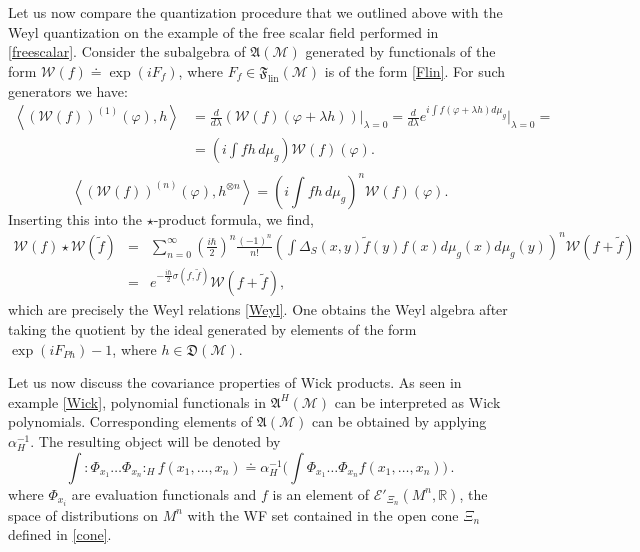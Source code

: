 \documentclass[12pt]{article}
\newcommand{\fA}{\mathfrak{A}}
\newcommand{\D}{\mathfrak{D}}
\newcommand{\F}{\mathfrak{F}}
\newcommand{\Ecal}{\mathcal{E}}
\newcommand{\Mcal}{\mathcal{M}}
\newcommand{\Wcal}{\mathcal{W}}
\newcommand{\RR}{\mathbb{R}}           %
\newcommand{\al}{\alpha}
\newcommand{\ph}{\varphi}
\newcommand{\sst}[1]{\scriptscriptstyle{#1}}  %
\newcommand{\1}{\mathds{1}}                         %
\newcommand{\be}{\begin{equation}}
\newcommand{\ee}{\end{equation}}
\begin{document}
{{Let us now compare the quantization procedure that we outlined above with the Weyl quantization on the example of the free scalar field performed in \ref{freescalar}. Consider the subalgebra of $\fA(\Mcal)$ generated by functionals of the form $\Wcal(f)\doteq\exp(iF_f)$, where $F_f\in \F_{\textrm{lin}}(\Mcal)$ is of the form \eqref{Flin}. For such generators we have:
\begin{align*}
\left< (\Wcal(f))^{(1)}(\ph),h\right>&= \frac{d}{d\lambda}\left( \Wcal(f) (\ph + \lambda h)\right)|_{\lambda=0}= \frac{d}{d \lambda}  e^{i \int  f (\ph + \lambda h)d\mu_g} \big|_{\lambda=0}=\\
&=\left( i \int f h\,d\mu_g\right) \Wcal(f)(\ph).\\
\end{align*}
\[
\left<(\Wcal(f))^{(n)}(\ph),h^{\otimes n}\right>=  \left( i \int f h\,d\mu_g\right)^n \Wcal(f)(\ph).
\]
Inserting this into the $\star$-product formula, we find,
\begin{eqnarray*}
\Wcal(f) \star \Wcal(\tilde{f}) &=&  \sum_{n=0}^{\infty} \left( \frac{i \hbar}{2}\right)^n \frac{(-1)^n}{n!} \left( \int \Delta_S(x,y) \tilde{f}(y)f(x)d\mu_g(x)d\mu_g(y)\right)^n\Wcal(f+\tilde{f})\\
&=& e^{-\frac{i \hbar}{2}\sigma(f,\tilde{f})} \Wcal(f+\tilde{f}),
\end{eqnarray*}
which are precisely the Weyl relations \eqref{Weyl}. One obtains the Weyl algebra after taking the quotient by the ideal generated by elements of the form $\exp(iF_{Ph})-1$, where $h\in\D(\Mcal)$.

 Let us now discuss the covariance properties of Wick products. As seen in example \ref{Wick}, polynomial functionals in $\fA^{\sst H}(\Mcal)$ can be interpreted as Wick polynomials.
Corresponding elements of $\fA(\Mcal)$ can be obtained by applying $\al_H^{-1}$. The resulting object will be denoted by
\be\label{polynomials1}
\int :\Phi_{x_1}\dots\Phi_{x_n}:_H f(x_1,\dots, x_n)\doteq \al^{-1}_H\Big(\int \Phi_{x_1}\dots\Phi_{x_n} f(x_1,\dots, x_n)\Big)\,.
\ee
where $\Phi_{x_i}$ are evaluation functionals and $f$ is an element of $\Ecal'_{\Xi_n}(M^n,\RR)$, the space of distributions on $M^n$ with the WF set contained in the open cone $\Xi_n$ defined in \eqref{cone}.
 
}}
\end{document}
